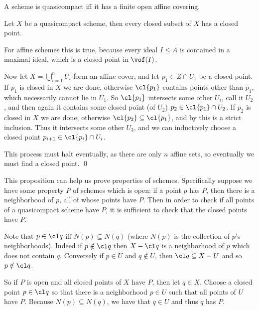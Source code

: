 \bcoro

    A scheme is quasicompact iff it has a finite open affine covering.

\ecoro

\bprop

    Let $X$ be a quasicompact scheme, then every closed subset of $X$ has a closed point.

\eprop

\bproof

    For affine schemes this is true, because every ideal $I\leq A$ is contained in a maximal ideal, which is a closed point in $\vof(I)$.

    Now let $X=\bigcup_{i=1}^nU_i$ form an affine cover, and let $p_1\in Z\cap U_1$ be a closed point.
    If $p_1$ is closed in $X$ we are done, otherwise $\cl{p_1}$ contains points other than $p_1$, which necessarily cannot lie in $U_1$.
    So $\cl{p_1}$ intersects some other $U_i$, call it $U_2$, and then again it contains some closed point (of $U_2$) $p_2\in\cl{p_1}\cap U_2$.
    If $p_2$ is closed in $X$ we are done, otherwise $\cl{p_2}\subseteq\cl{p_1}$, and by  this is a strict inclusion.
    Thus it intersects some other $U_3$, and we can inductively choose a closed point $p_{i+1}\in\cl{p_i}\cap U_i$.

    This process must halt eventually, as there are only $n$ affine sets, so eventually we must find a closed point.
    \qed

\eproof

\bremark

    This proposition can help us prove properties of schemes.
    Specifically suppose we have some property $P$ of schemes which is {\emphcolor open}: if a point $p$ has $P$, then there is a neighborhood of $p$, all of whose points have $P$.
    Then in order to check if all points of a quasicompact scheme have $P$, it is sufficient to check that the closed points have $P$.

    Note that $p\in\cl q$ iff $N(p)\subseteq N(q)$ (where $N(p)$ is the collection of $p$'s neighborhoods).
    Indeed if $p\notin\cl q$ then $X-\cl q$ is a neighborhood of $p$ which does not contain $q$.
    Conversely if $p\in U$ and $q\notin U$, then $\cl q\subseteq X-U$ and so $p\notin\cl q$.

    So if $P$ is open and all closed points of $X$ have $P$, then let $q\in X$.
    Choose a closed point $p\in\cl q$ so that there is a neighborhood $p\in U$ such that all points of $U$ have $P$.
    Because $N(p)\subseteq N(q)$, we have that $q\in U$ and thus $q$ has $P$.

